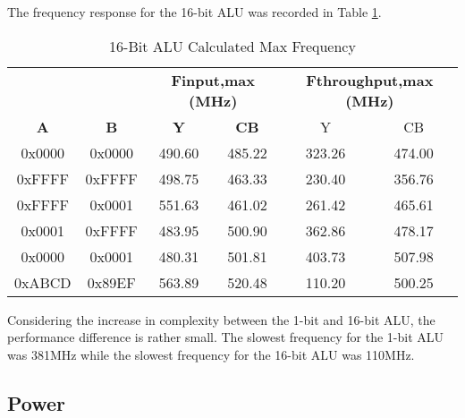 \documentclass[11pt]{article}
\begin{document}
			The frequency response for the 16-bit ALU was recorded in Table \ref{tab:ALU-16-Bit-Freq}.
		
			\begin{table}[H]
				\centering
				\caption{16-Bit ALU Calculated Max Frequency}
				\label{tab:ALU-16-Bit-Freq}
				\begin{tabular}{|cc|cc|cc|}
					\hline
					\multicolumn{1}{|c}{\textbf{}}  & \multicolumn{1}{c}{\textbf{}}  & \multicolumn{2}{|c|}{\textbf{Finput,max (MHz)}} & \multicolumn{2}{c|}{\textbf{Fthroughput,max (MHz)}} \\
					\textbf{A} & \textbf{B} & \textbf{Y}            & \textbf{CB}           & Y                        & CB                      \\
					\hline
					0x0000     & 0x0000     & 490.60                & 485.22                & 323.26                   & 474.00                  \\
					0xFFFF                         & 0xFFFF                         & 498.75                & 463.33                & 230.40                   & 356.76                  \\
					0xFFFF                         & 0x0001                         & 551.63                & 461.02                & 261.42                   & 465.61                  \\
					0x0001                         & 0xFFFF                         & 483.95                & 500.90                & 362.86                   & 478.17                  \\
					0x0000                         & 0x0001                         & 480.31                & 501.81                & 403.73                   & 507.98                  \\
					0xABCD                         & 0x89EF                         & 563.89                & 520.48                & 110.20                   & 500.25                 \\
					\hline
				\end{tabular}
			\end{table}
		
			Considering the increase in complexity between the 1-bit and 16-bit ALU, the performance difference is  rather small. The slowest frequency for the 1-bit ALU was 381MHz while the slowest frequency for the 16-bit ALU was 110MHz.
	
	\subsection{Power}
	
\end{document}
